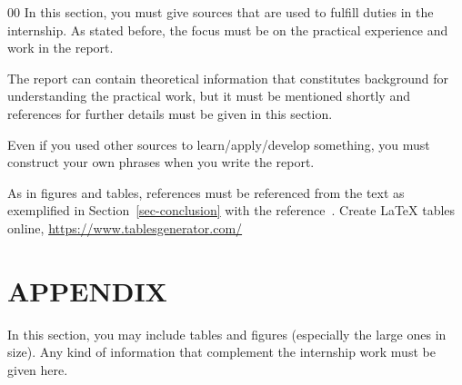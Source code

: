 \documentclass[12pt]{article}
\begin{document}

\begin{thebibliography}{00}
In this section, you must give sources that are 
used to fulfill duties in the internship. 
As stated before, the focus must be on the practical 
experience and work in the report. 
\par %
The report can contain theoretical information that 
constitutes background for understanding the practical work, 
but it must be mentioned shortly and references for further 
details must be given in this section. 
\par %
Even if you used other sources to learn/apply/develop something, 
you must construct your own phrases when you write the report.
\par %
As in figures and tables, references must be referenced from 
the text as exemplified in Section~\ref{sec-conclusion} with 
the reference~\cite{ref-tablegenerator}.
Create LaTeX tables online,
\url{https://www.tablesgenerator.com/}
\end{thebibliography}


\section{APPENDIX}
\label{sec-appendix}
\par %
In this section, you may include tables and figures 
(especially the large ones in size). 
Any kind of information that complement the internship 
work must be given here. 
\end{document}
